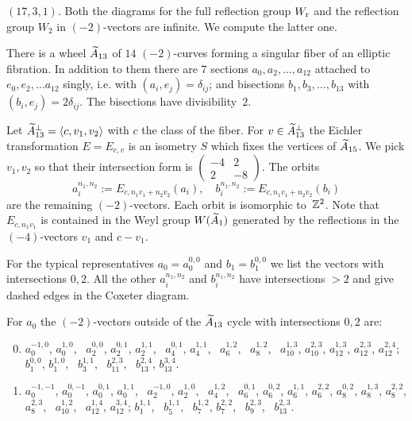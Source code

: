\documentclass{amsart}
\begin{document}
\smallskip\underline{$(17,3,1)$}. 
Both the diagrams for the full reflection
group $W_{\rm r}$ and the reflection group $W_2$ in $(-2)$-vectors are
infinite. We compute the latter one.

There is a wheel ${\widetilde A}_{13}$ of $14$ $(-2)$-curves forming a singular
fiber of an elliptic fibration. In addition to them there are $7$
sections $a_0, a_2, \dotsc, a_{12}$ attached to $e_0,e_2, \dotsc a_{12}$
singly, i.e. with $(a_i,e_j) =\delta_{ij}$; and bisections $b_1, b_3,
\dotsc, b_{13}$ with $(b_i,e_j) = 2\delta_{ij}$. The bisections
have divisibility~$2$. 

Let ${\widetilde A}_{13}^\perp = \langle c, v_1, v_2 \rangle$ with $c$ the class of the
fiber. For $v\in{\widetilde A}_{13}^\perp$ the Eichler transformation
$E = E_{c,v}$ is an isometry $S$ which fixes the vertices of
${\widetilde A}_{15}$. We pick $v_1,v_2$ so that their intersection form is
$\begin{pmatrix}
  -4 & 2\\ 2 & -8
\end{pmatrix}.$  The orbits
\begin{displaymath}
a_i^{n_1,n_2} := E_{c,n_1v_1+n_2v_2}(a_i), \quad  
b_i^{n_1,n_2} := E_{c,n_1v_1+n_2v_2}(b_i)
\end{displaymath}
are the remaining $(-2)$-vectors. Each orbit is isomorphic
to~${\mathbb Z}^2$. Note that $E_{c,n_1v_1}$ is contained in the Weyl group
$W({\widetilde A}_1)$ generated by the reflections in the $(-4)$-vectors $v_1$
and $c-v_1$.

For the typical representatives $a_0=a_0^{0,0}$ and $b_1=b_1^{0,0}$ we list
the vectors with intersections $0,2$. All the other $a_i^{n_1,n_2}$ and
$b_i^{n_1,n_2}$ have intersections $>2$ and give dashed edges in the
Coxeter diagram. 

For $a_0$ the $(-2)$-vectors outside of the ${\widetilde A}_{13}$ cycle with
intersections $0,2$ are: 

\begin{enumerate}
  \setcounter{enumi}{-1}
\item   $a_0^{-1,0}$, $a_0^{1,0}$, \ 
  $a_2^{0,0}$, $a_2^{0,1}$, $a_2^{1,1}$, \ 
  $a_4^{0,1}$, $a_4^{1,1}$, \ 
  $a_6^{1,2}$, \ 
  $a_8^{1,2}$, \ 
  $a_{10}^{1,3}$, $a_{10}^{2,3}$, \newline
  $a_{12}^{1,3}$, $a_{12}^{2,3}$, $a_{12}^{2,4}$;  \qquad
  $b_1^{0,0}$, $b_1^{1,0}$, \ 
  $b_3^{1,1}$, \ 
  $b_{11}^{2,3}$, \ 
  $b_{13}^{2,4}$, $b_{13}^{3,4}$.
  \setcounter{enumi}{1}
\item $a_0^{-1,-1}$, $a_0^{0,-1}$, $a_0^{0,1}$, $a_0^{1,1}$, \ 
  $a_2^{-1,0}$, $a_2^{1,0}$, \ 
  $a_4^{1,2}$, \ 
  $a_6^{0,1}$, $a_6^{0,2}$, $a_6^{1,1}$, $a_6^{2,2}$, \newline
  $a_8^{0,2}$, $a_8^{1,3}$, $a_8^{2,2}$, $a_8^{2,3}$, \ 
  $a_{10}^{1,2}$, \ 
  $a_{12}^{1,4}$, $a_{12}^{3,4}$; \qquad
  $b_1^{1,1}$,  \ 
  $b_5^{1,1}$, \ 
  $b_7^{1,2}$, $b_7^{2,2}$, \ 
  $b_9^{2,3}$, \ 
  $b_{13}^{2,3}$.
\end{enumerate}
\end{document}
